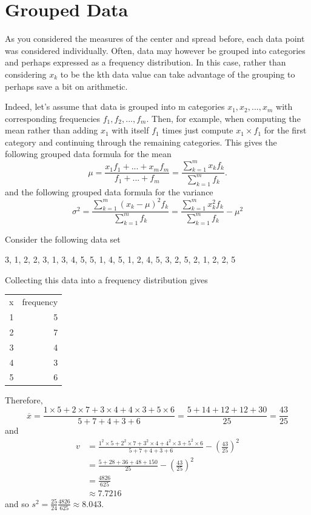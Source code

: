 \documentclass[10pt,]{book}
\theoremstyle{plain}
\theoremstyle{definition}
\theoremstyle{definition}
\theoremstyle{definition}
\numberwithin{equation}{section}
\newcommand{\hrulemedium}{\noalign{\hrule height 0.07em}}
\begin{document}
\section[Grouped Data]{Grouped Data}\label{section-9}
As you considered the measures of the center and spread before, each data point was considered individually. Often, data may however be grouped into categories and perhaps expressed as a frequency distribution. In this case, rather than considering \(x_k\) to be the kth data value can take advantage of the grouping to perhaps save a bit on arithmetic.%
\par
Indeed, let's assume that data is grouped into m categories \(x_1, x_2, ..., x_m\) with corresponding frequencies \(f_1, f_2, ..., f_m\). Then, for example, when computing the mean rather than adding \(x_1\) with itself \(f_1\) times just compute \(x_1 \times f_1\) for the first category and continuing through the remaining categories. This gives the following grouped data formula for the mean
		\begin{equation*}
		\mu = \frac{x_1 f_1 + ... + x_m f_m}{f_1 + ... + f_m} = \frac{\sum_{k=1}^m x_k f_k}{\sum_{k=1}^m f_k}.
		\end{equation*}
and the following grouped data formula for the variance
		\begin{equation*} 
		\sigma^2 = \frac{\sum_{k=1}^m ( x_k-\mu )^2 f_k}{\sum_{k=1}^m f_k} = \frac{\sum_{k=1}^m x_k^2 f_k}{\sum_{k=1}^m f_k} - \mu^2
		\end{equation*}

%
\par

Consider the following data set
%
\par
{3,
1,
2,
2,
3,
1,
3,
4,
5,
5,
1,
4,
5,
1,
2,
4,
5,
3,
2,
5,
2,
1,
2,
2,
5}%
\par

Collecting this data into a frequency distribution gives
\leavevmode%
\begin{table}
\centering
\begin{tabular}{rr}
x&frequency\tabularnewline\hrulemedium
1&5\tabularnewline[0pt]
2&7\tabularnewline[0pt]
3&4\tabularnewline[0pt]
4&3\tabularnewline[0pt]
5&6
\end{tabular}
\end{table}

Therefore, 
	\begin{equation*}
	\overline{x} = \frac{1 \times 5 + 2 \times 7 + 3 \times 4 + 4 \times 3 + 5 \times 6}{5+7+4+3+6} = \frac{5 + 14 + 12 + 12 + 30}{25} = \frac{43}{25}
	\end{equation*}
and 
	\begin{align*}
v & = \frac{1^2 \times 5 + 2^2 \times 7 + 3^2 \times 4 + 4^2 \times 3 + 5^2 \times 6}{5+7+4+3+6} - \left ( \frac{43}{25} \right )^2 \\
 & = \frac{5 + 28 + 36 + 48 + 150}{25} - \left ( \frac{43}{25} \right )^2 \\
 & = \frac{4826}{625}\\
 & \approx 7.7216
\end{align*}
and so \(s^2 = \frac{25}{24} \frac{4826}{625} \approx 8.043\). 
%
\typeout{************************************************}
\typeout{************************************************}
\end{document}
